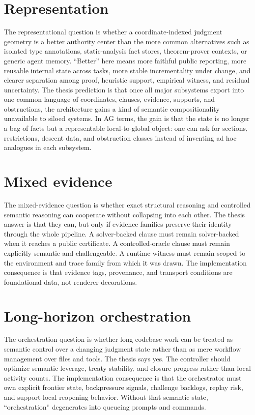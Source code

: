 \documentclass[11pt]{report}
\begin{document}
\section{Representation}
The representational question is whether a coordinate-indexed judgment geometry is a better authority center than the more common alternatives such as isolated type annotations, static-analysis fact stores, theorem-prover contexts, or generic agent memory. ``Better'' here means more faithful public reporting, more reusable internal state across tasks, more stable incrementality under change, and clearer separation among proof, heuristic support, empirical witness, and residual uncertainty. The thesis prediction is that once all major subsystems export into one common language of coordinates, clauses, evidence, supports, and obstructions, the architecture gains a kind of semantic compositionality unavailable to siloed systems. In AG terms, the gain is that the state is no longer a bag of facts but a representable local-to-global object: one can ask for sections, restrictions, descent data, and obstruction classes instead of inventing ad hoc analogues in each subsystem.

\section{Mixed evidence}
The mixed-evidence question is whether exact structural reasoning and controlled semantic reasoning can cooperate without collapsing into each other. The thesis answer is that they can, but only if evidence families preserve their identity through the whole pipeline. A solver-backed clause must remain solver-backed when it reaches a public certificate. A controlled-oracle clause must remain explicitly semantic and challengeable. A runtime witness must remain scoped to the environment and trace family from which it was drawn. The implementation consequence is that evidence tags, provenance, and transport conditions are foundational data, not renderer decorations.

\section{Long-horizon orchestration}
The orchestration question is whether long-codebase work can be treated as semantic control over a changing judgment state rather than as mere workflow management over files and tools. The thesis says yes. The controller should optimize semantic leverage, treaty stability, and closure progress rather than local activity counts. The implementation consequence is that the orchestrator must own explicit frontier state, backpressure signals, challenge backlogs, replay risk, and support-local reopening behavior. Without that semantic state, ``orchestration'' degenerates into queueing prompts and commands.
\end{document}
